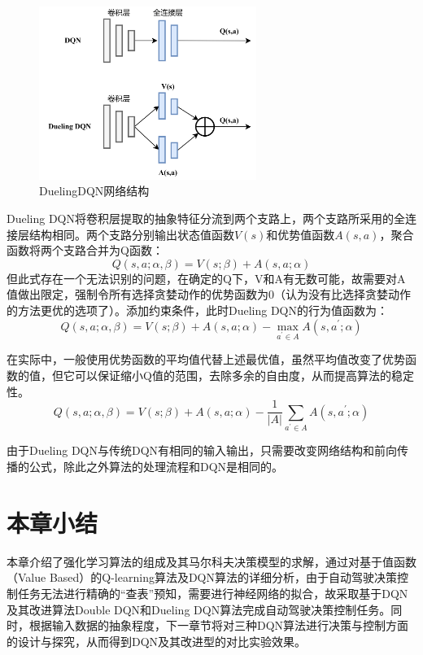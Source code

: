 \begin{figure}[htbp]
    \centering
    \includegraphics[width=0.63\textwidth]{images/chapter2/Dueling_DQN.png}
    \caption{DuelingDQN网络结构}\label{DuelingDQN网络结构} %
\end{figure}

Dueling DQN将卷积层提取的抽象特征分流到两个支路上，两个支路所采用的全连接层结构相同。两个支路分别输出状态值函数$V(s)$和优势值函数$A(s,a)$，聚合函数将两个支路合并为Q函数：
\begin{equation*}
    Q(s,a;\alpha,\beta) = V(s;\beta) + A(s,a;\alpha)
\end{equation*}
但此式存在一个无法识别的问题，在确定的Q下，V和A有无数可能，故需要对A值做出限定，强制令所有选择贪婪动作的优势函数为0（认为没有比选择贪婪动作的方法更优的选项了）。添加约束条件，此时Dueling DQN的行为值函数为：
\begin{equation}
    Q(s,a;\alpha,\beta) = V(s;\beta) + A(s,a;\alpha) - \max_{a^{'} \in A}A(s,a^{'};\alpha)
\end{equation}

在实际中，一般使用优势函数的平均值代替上述最优值，虽然平均值改变了优势函数的值，但它可以保证缩小Q值的范围，去除多余的自由度，从而提高算法的稳定性。
\begin{equation}
    Q(s,a;\alpha,\beta) = V(s;\beta) + A(s,a;\alpha) - \frac{1}{\left | A \right | } \sum_{a^{'} \in A}A(s,a^{'};\alpha)
\end{equation}

由于Dueling DQN与传统DQN有相同的输入输出，只需要改变网络结构和前向传播的公式，除此之外算法的处理流程和DQN是相同的。

\section{本章小结}%

本章介绍了强化学习算法的组成及其马尔科夫决策模型的求解，通过对基于值函数（Value Based）的Q-learning算法及DQN算法的详细分析，由于自动驾驶决策控制任务无法进行精确的“查表”预知，需要进行神经网络的拟合，故采取基于DQN及其改进算法Double DQN和Dueling DQN算法完成自动驾驶决策控制任务。同时，根据输入数据的抽象程度，下一章节将对三种DQN算法进行决策与控制方面的设计与探究，从而得到DQN及其改进型的对比实验效果。
